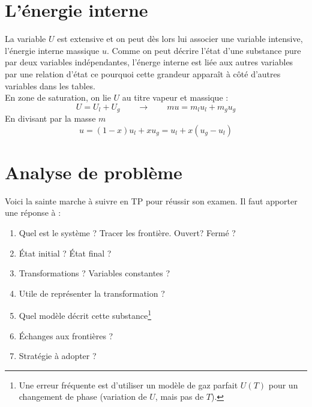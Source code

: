 \section{L'énergie interne}
La variable $U$ est extensive et on peut dès lors lui associer une 
variable intensive, l'énergie interne massique $u$. Comme on peut 
décrire l'état d'une substance pure par deux variables indépendantes, 
l'énerge interne est liée aux autres variables par une relation d'état 
ce pourquoi cette grandeur apparaît à côté d'autres variables dans les 
tables.\\
En zone de saturation, on lie $U$ au titre vapeur et massique :
\begin{equation}
U = U_l+U_g \qquad\rightarrow\qquad mu = m_lu_l + m_gu_g
\end{equation}
En divisant par la masse $m$
\begin{equation}
u = (1-x)u_l + xu_g = u_l + x(u_g-u_l)
\end{equation}

\section{Analyse de problème}
Voici la sainte marche à suivre en TP pour réussir son examen. Il 
faut apporter une réponse à : 
\begin{enumerate}
\item Quel est le système ? Tracer les frontière. Ouvert? Fermé ?
\item État initial ? État final ?
\item Transformations ? Variables constantes ?
\item Utile de représenter la transformation ?
\item Quel modèle décrit cette substance\footnote{Une erreur fréquente 
est d'utiliser un modèle de gaz parfait $U(T)$ pour un changement de 
phase (variation de $U$, mais pas de $T$).}
\item Échanges aux frontières ?
\item Stratégie à adopter ?
\end{enumerate}

